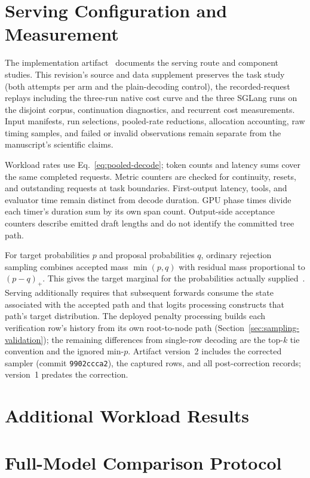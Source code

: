\documentclass[conference]{IEEEtran}
\begin{document}
\appendices
\section{Serving Configuration and Measurement}
\label{app:audit}
\label{app:settings}
The implementation artifact~\cite{lumo2026archive} documents the serving route and component studies. This revision's source and data supplement preserves the task study (both attempts per arm and the plain-decoding control), the recorded-request replays including the three-run native cost curve and the three SGLang runs on the disjoint corpus, continuation diagnostics, and recurrent cost measurements. Input manifests, run selections, pooled-rate reductions, allocation accounting, raw timing samples, and failed or invalid observations remain separate from the manuscript's scientific claims.


Workload rates use Eq.~\ref{eq:pooled-decode}; token counts and latency sums cover the same completed requests. Metric counters are checked for continuity, resets, and outstanding requests at task boundaries. First-output latency, tools, and evaluator time remain distinct from decode duration. GPU phase times divide each timer's duration sum by its own span count. Output-side acceptance counters describe emitted draft lengths and do not identify the committed tree path.

For target probabilities $p$ and proposal probabilities $q$, ordinary rejection sampling combines accepted mass $\min(p,q)$ with residual mass proportional to $(p-q)_+$. This gives the target marginal for the probabilities actually supplied~\cite{leviathan2023fast,chen2023sampling}. Serving additionally requires that subsequent forwards consume the state associated with the accepted path and that logits processing constructs that path's target distribution. The deployed penalty processing builds each verification row's history from its own root-to-node path (Section~\ref{sec:sampling-validation}); the remaining differences from single-row decoding are the top-$k$ tie convention and the ignored min-$p$. Artifact version~2 includes the corrected sampler (commit \texttt{9902ccca2}), the captured rows, and all post-correction records; version~1 predates the correction.

\section{Additional Workload Results}
\label{app:workload}


\section{Full-Model Comparison Protocol}
\label{app:fullmodel-protocol}


\FloatBarrier
\label{ReferencesStart}


\end{document}

